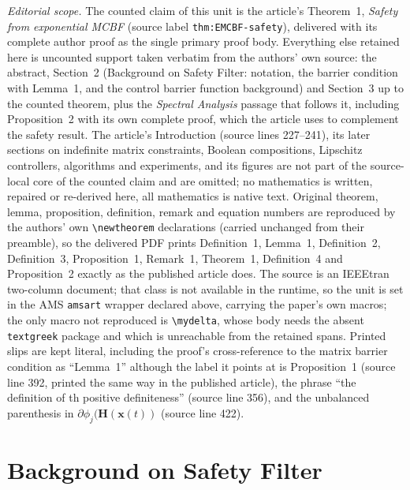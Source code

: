 \documentclass[10pt,a4paper]{amsart}
\theoremstyle{definition}
\begin{document}
\noindent\textit{Editorial scope.} The counted claim of this unit is the article's Theorem~1, \emph{Safety from exponential MCBF} (source label \texttt{thm:EMCBF-safety}), delivered with its complete author proof as the single primary proof body. Everything else retained here is uncounted support taken verbatim from the authors' own source: the abstract, Section~2 (Background on Safety Filter: notation, the barrier condition with Lemma~1, and the control barrier function background) and Section~3 up to the counted theorem, plus the \emph{Spectral Analysis} passage that follows it, including Proposition~2 with its own complete proof, which the article uses to complement the safety result. The article's Introduction (source lines 227--241), its later sections on indefinite matrix constraints, Boolean compositions, Lipschitz controllers, algorithms and experiments, and its figures are not part of the source-local core of the counted claim and are omitted; no mathematics is written, repaired or re-derived here, all mathematics is native text. Original theorem, lemma, proposition, definition, remark and equation numbers are reproduced by the authors' own \texttt{\textbackslash newtheorem} declarations (carried unchanged from their preamble), so the delivered PDF prints Definition~1, Lemma~1, Definition~2, Definition~3, Proposition~1, Remark~1, Theorem~1, Definition~4 and Proposition~2 exactly as the published article does. The source is an IEEEtran two-column document; that class is not available in the runtime, so the unit is set in the AMS \texttt{amsart} wrapper declared above, carrying the paper's own macros; the only macro not reproduced is \texttt{\textbackslash mydelta}, whose body needs the absent \texttt{textgreek} package and which is unreachable from the retained spans. Printed slips are kept literal, including the proof's cross-reference to the matrix barrier condition as ``Lemma~1'' although the label it points at is Proposition~1 (source line 392, printed the same way in the published article), the phrase ``the definition of th positive definiteness'' (source line 356), and the unbalanced parenthesis in $\partial\phi_j(\mathbf{H}(\mathbf{x}(t))$ (source line 422).
\section{Background on Safety Filter}
\end{document}

